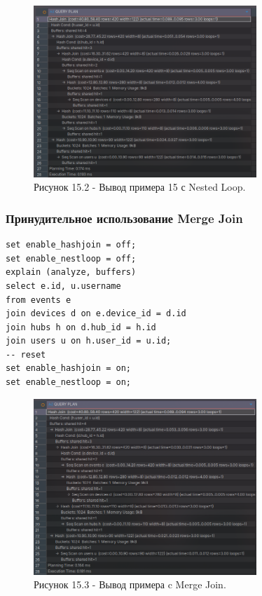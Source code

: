 \documentclass[oneside,a4paper,14pt]{extarticle}
\begin{document}
\begin{figure}[H]
  \centering
  \includegraphics[width=0.75\textwidth]{pics/nested_loop.png}
  \caption*{Рисунок 15.2 - Вывод примера 15 с Nested Loop.}
\end{figure}

\clearpage
\subsubsection*{Принудительное использование Merge Join}
\begin{verbatim}
set enable_hashjoin = off;
set enable_nestloop = off;
explain (analyze, buffers)
select e.id, u.username
from events e
join devices d on e.device_id = d.id
join hubs h on d.hub_id = h.id
join users u on h.user_id = u.id;
-- reset
set enable_hashjoin = on;
set enable_nestloop = on;
\end{verbatim}

\begin{figure}[H]
  \centering
  \includegraphics[width=0.75\textwidth]{pics/merge_join.png}
  \caption*{Рисунок 15.3 - Вывод примера c Merge Join.}
\end{figure}
\end{document}
